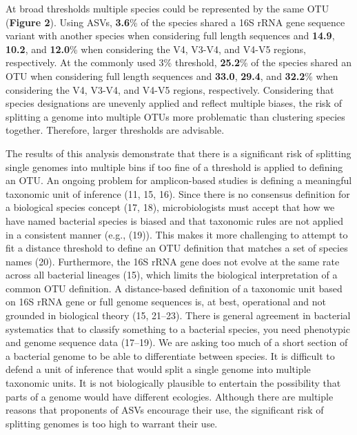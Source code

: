 \documentclass[
]{article}
\begin{document}
At broad thresholds multiple species could be represented by the same
OTU (\textbf{Figure 2}). Using ASVs, \textbf{3.6}\% of the species
shared a 16S rRNA gene sequence variant with another species when
considering full length sequences and \textbf{14.9}, \textbf{10.2}, and
\textbf{12.0}\% when considering the V4, V3-V4, and V4-V5 regions,
respectively. At the commonly used 3\% threshold, \textbf{25.2}\% of the
species shared an OTU when considering full length sequences and
\textbf{33.0}, \textbf{29.4}, and \textbf{32.2}\% when considering the
V4, V3-V4, and V4-V5 regions, respectively. Considering that species
designations are unevenly applied and reflect multiple biases, the risk
of splitting a genome into multiple OTUs more problematic than
clustering species together. Therefore, larger thresholds are advisable.

The results of this analysis demonstrate that there is a significant
risk of splitting single genomes into multiple bins if too fine of a
threshold is applied to defining an OTU. An ongoing problem for
amplicon-based studies is defining a meaningful taxonomic unit of
inference (11, 15, 16). Since there is no consensus definition for a
biological species concept (17, 18), microbiologists must accept that
how we have named bacterial species is biased and that taxonomic rules
are not applied in a consistent manner (e.g., (19)). This makes it more
challenging to attempt to fit a distance threshold to define an OTU
definition that matches a set of species names (20). Furthermore, the
16S rRNA gene does not evolve at the same rate across all bacterial
lineages (15), which limits the biological interpretation of a common
OTU definition. A distance-based definition of a taxonomic unit based on
16S rRNA gene or full genome sequences is, at best, operational and not
grounded in biological theory (15, 21--23). There is general agreement
in bacterial systematics that to classify something to a bacterial
species, you need phenotypic and genome sequence data (17--19). We are
asking too much of a short section of a bacterial genome to be able to
differentiate between species. It is difficult to defend a unit of
inference that would split a single genome into multiple taxonomic
units. It is not biologically plausible to entertain the possibility
that parts of a genome would have different ecologies. Although there
are multiple reasons that proponents of ASVs encourage their use, the
significant risk of splitting genomes is too high to warrant their use.
\end{document}
